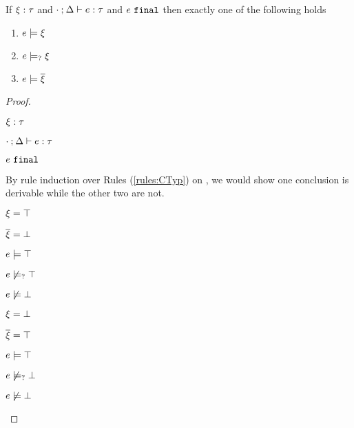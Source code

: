 \begin{theorem}
  \label{thrm:exclusive-constraint-satisfaction}
  If $\xi : \tau$ and $\cdot \mathbin{;} \Delta \vdash e : \tau$ and $e ~\mathtt{final}$ then exactly one of the following holds
  \begin{enumerate}
    \item $e \models \xi$
    \item $e \models_{?} \xi$
    \item $e \models \overline{\xi}$
  \end{enumerate}
\end{theorem}
\begin{proof}
\begin{pfsteps*}
\item $\xi : \tau$  
\item $\cdot \mathbin{;} \Delta \vdash e : \tau$  
\item $e ~\mathtt{final}$  
\end{pfsteps*}
By rule induction over Rules (\ref{rules:CTyp}) on , we would show one conclusion is derivable while the other two are not.
\begin{byCases}

\item[\text{(\ref{rule:CTTruth})}]
    \begin{pfsteps*}
    \item $\xi=\top$ 
    \item $\overline{\xi}=\bot$ 
    \item $e \models \top$ 
    \item $e \not\models_{?} \top$ 
    \item $e \not\models \bot$ 
    \end{pfsteps*}
    
\item[\text{(\ref{rule:CTFalsity})}]
    \begin{pfsteps*}
    \item $\xi=\bot$ 
    \item $\overline{\xi}=\top$ 
    \item $e \models \top$ 
    \item $e \not\models_{?} \bot$ 
    \item $e \not\models \bot$ 
    \end{pfsteps*}
    

\end{byCases}
\end{proof}
